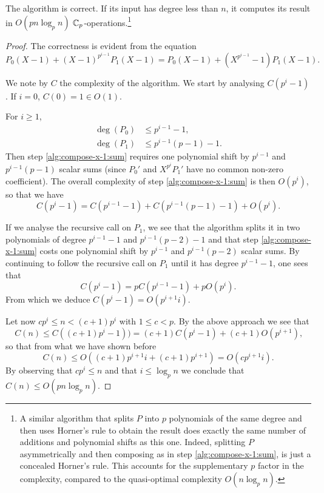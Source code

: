 \begin{theorem}
  \label{th:x-1}
  The algorithm  is correct. If its input has degree
  less than $n$, it computes its result in $O(pn\log_pn)$
  $\mathbb{C}_p$-operations.\footnote{A similar algorithm that splits $P$ into
    $p$ polynomials of the same degree and then uses Horner's rule to
    obtain the result does exactly the same number of additions and
    polynomial shifts as this one. Indeed, splitting $P$
    asymmetrically and then composing as in step
    \ref{alg:compose-x-1:sum}, is just a concealed Horner's rule. This
    accounts for the supplementary $p$ factor in the complexity,
    compared to the quasi-optimal complexity $O(n\log_pn)$.}
\end{theorem}
\begin{proof}
  The correctness is evident from the equation
  \begin{equation*}
    P_0(X-1) + (X-1)^{p^{i-1}}P_1(X-1) =
    P_0(X-1) + (X^{p^{i-1}}-1)P_1(X-1)\text{.}
  \end{equation*}

  We note by $C$ the complexity of the algorithm. We start by
  analysing $C(p^i-1)$. If $i=0$, $C(0) = 1\in O(1)$.

  For $i\ge1$, 
  \begin{align*}
    \deg(P_0)&\le p^{i-1}-1\text{,}\\
    \deg(P_1)&\le p^{i-1}(p-1)-1\text{.}
  \end{align*}
  Then step \ref{alg:compose-x-1:sum} requires one polynomial shift by
  $p^{i-1}$ and $p^{i-1}(p-1)$ scalar sums (since $P_0'$ and
  $X^{p^i}P_1'$ have no common non-zero coefficient). The overall
  complexity of step \ref{alg:compose-x-1:sum} is then $O(p^i)$, so
  that we have
  \[C(p^i-1) = C(p^{i-1}-1) + C(p^{i-1}(p-1)-1) + O(p^i)\text{.}\]

  If we analyse the recursive call on $P_1$, we see that the algorithm
  splits it in two polynomials of degree $p^{i-1}-1$ and
  $p^{i-1}(p-2)-1$ and that step \ref{alg:compose-x-1:sum} costs one
  polynomial shift by $p^{i-1}$ and $p^{i-1}(p-2)$ scalar sums. By
  continuing to follow the recursive call on $P_1$ until it has degree
  $p^{i-1}-1$, one sees that
  \[C(p^i-1) = pC(p^{i-1}-1) + pO(p^i)\text{.}\]
  From which we deduce $C(p^i-1) = O(p^{i+1}i)$.

  Let now $cp^i\le n<(c+1)p^i$ with $1\le c<p$. By the above approach
  we see that
  \[C(n) \le C((c+1)p^i-1)) = (c+1)C(p^i-1) + (c+1)O(p^{i+1})\text{,}\]
  so that from what we have shown before
  \begin{equation*}
    C(n) \le O\left((c+1)p^{i+1}i + (c+1)p^{i+1}\right) = 
    O\left(cp^{i+1}i\right)
    \text{.}
  \end{equation*}
  By observing that $cp^i\le n$ and that $i\le\log_pn$ we conclude
  that $C(n) \le O(pn\log_pn)$.
\end{proof}

